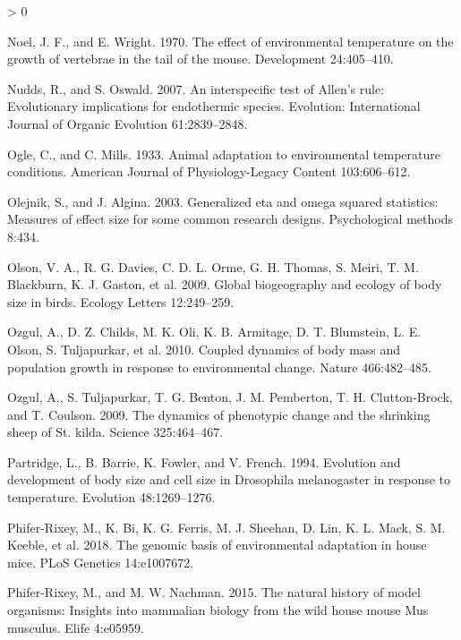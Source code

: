 \documentclass[
]{article}
\newlength{\cslhangindent}
\newenvironment{CSLReferences}[2] %
 {%
  \setlength{\parindent}{0pt}
  \ifodd #1 \everypar{\setlength{\hangindent}{\cslhangindent}}\ignorespaces\fi
  \ifnum #2 > 0
  \setlength{\parskip}{#2\baselineskip}
  \fi
 }%
 {}
\begin{document}
\begin{CSLReferences}{0}{0}
\leavevmode\hypertarget{ref-Noel1970}{}%
Noel, J. F., and E. Wright. 1970. The effect of environmental
temperature on the growth of vertebrae in the tail of the mouse.
Development 24:405--410.

\leavevmode\hypertarget{ref-Nudds2007}{}%
Nudds, R., and S. Oswald. 2007. An interspecific test of {Allen's} rule:
Evolutionary implications for endothermic species. Evolution:
International Journal of Organic Evolution 61:2839--2848.

\leavevmode\hypertarget{ref-Ogle1933}{}%
Ogle, C., and C. Mills. 1933. Animal adaptation to environmental
temperature conditions. American Journal of Physiology-Legacy Content
103:606--612.

\leavevmode\hypertarget{ref-Olejnik2003}{}%
Olejnik, S., and J. Algina. 2003. Generalized eta and omega squared
statistics: Measures of effect size for some common research designs.
Psychological methods 8:434.

\leavevmode\hypertarget{ref-Olson2009}{}%
Olson, V. A., R. G. Davies, C. D. L. Orme, G. H. Thomas, S. Meiri, T. M.
Blackburn, K. J. Gaston, et al. 2009. Global biogeography and ecology of
body size in birds. Ecology Letters 12:249--259.

\leavevmode\hypertarget{ref-Ozgul2010}{}%
Ozgul, A., D. Z. Childs, M. K. Oli, K. B. Armitage, D. T. Blumstein, L.
E. Olson, S. Tuljapurkar, et al. 2010. Coupled dynamics of body mass and
population growth in response to environmental change. Nature
466:482--485.

\leavevmode\hypertarget{ref-Ozgul2009}{}%
Ozgul, A., S. Tuljapurkar, T. G. Benton, J. M. Pemberton, T. H.
Clutton-Brock, and T. Coulson. 2009. The dynamics of phenotypic change
and the shrinking sheep of {St.} kilda. Science 325:464--467.

\leavevmode\hypertarget{ref-Partridge1994}{}%
Partridge, L., B. Barrie, K. Fowler, and V. French. 1994. Evolution and
development of body size and cell size in {Drosophila} melanogaster in
response to temperature. Evolution 48:1269--1276.

\leavevmode\hypertarget{ref-Phifer-Rixey2018}{}%
Phifer-Rixey, M., K. Bi, K. G. Ferris, M. J. Sheehan, D. Lin, K. L.
Mack, S. M. Keeble, et al. 2018. The genomic basis of environmental
adaptation in house mice. PLoS Genetics 14:e1007672.

\leavevmode\hypertarget{ref-Phifer-Rixey2015}{}%
Phifer-Rixey, M., and M. W. Nachman. 2015. The natural history of model
organisms: Insights into mammalian biology from the wild house mouse
{Mus} musculus. Elife 4:e05959.


\end{CSLReferences}
\end{document}
